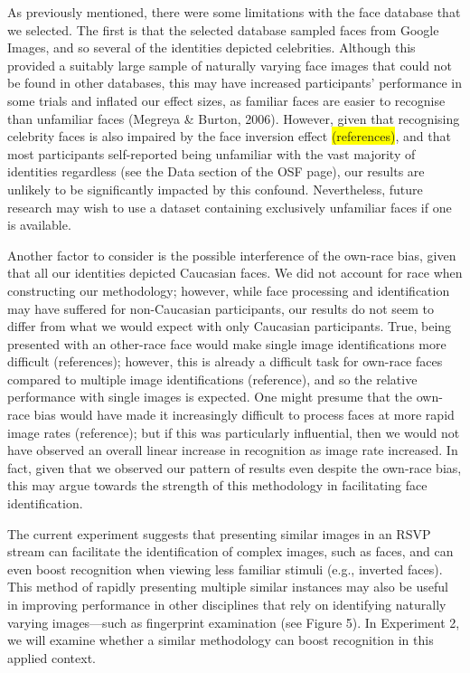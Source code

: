 \documentclass[
  english,
  man]{apa6}
\begin{document}
As previously mentioned, there were some limitations with the face database that we selected. The first is that the selected database sampled faces from Google Images, and so several of the identities depicted celebrities. Although this provided a suitably large sample of naturally varying face images that could not be found in other databases, this may have increased participants' performance in some trials and inflated our effect sizes, as familiar faces are easier to recognise than unfamiliar faces (Megreya \& Burton, 2006). However, given that recognising celebrity faces is also impaired by the face inversion effect \colorbox{yellow}{(references)}, and that most participants self-reported being unfamiliar with the vast majority of identities regardless (see the Data section of the OSF page), our results are unlikely to be significantly impacted by this confound. Nevertheless, future research may wish to use a dataset containing exclusively unfamiliar faces if one is available.

Another factor to consider is the possible interference of the own-race bias, given that all our identities depicted Caucasian faces. We did not account for race when constructing our methodology; however, while face processing and identification may have suffered for non-Caucasian participants, our results do not seem to differ from what we would expect with only Caucasian participants. True, being presented with an other-race face would make single image identifications more difficult (references); however, this is already a difficult task for own-race faces compared to multiple image identifications (reference), and so the relative performance with single images is expected. One might presume that the own-race bias would have made it increasingly difficult to process faces at more rapid image rates (reference); but if this was particularly influential, then we would not have observed an overall linear increase in recognition as image rate increased. In fact, given that we observed our pattern of results even despite the own-race bias, this may argue towards the strength of this methodology in facilitating face identification.

The current experiment suggests that presenting similar images in an RSVP stream can facilitate the identification of complex images, such as faces, and can even boost recognition when viewing less familiar stimuli (e.g., inverted faces). This method of rapidly presenting multiple similar instances may also be useful in improving performance in other disciplines that rely on identifying naturally varying images---such as fingerprint examination (see Figure 5). In Experiment 2, we will examine whether a similar methodology can boost recognition in this applied context.
\end{document}
